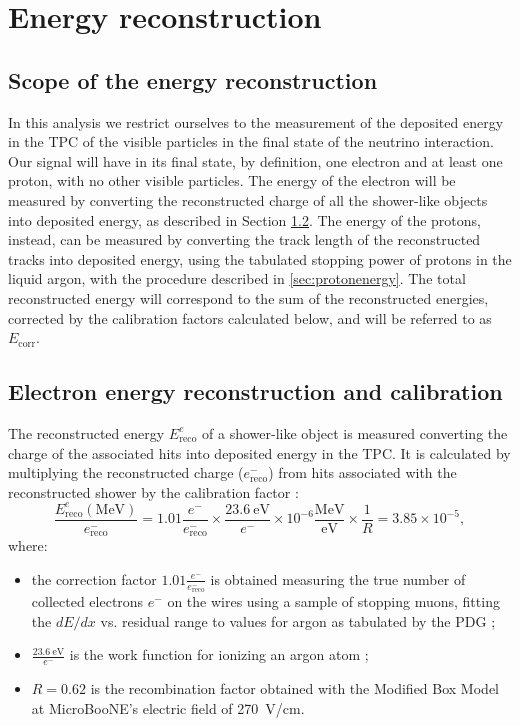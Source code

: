 
\section{Energy reconstruction}\label{sec:energyreco}
\subsection{Scope of the energy reconstruction}
In this analysis we restrict ourselves to the measurement of the deposited energy in the TPC of the visible particles in the final state of the neutrino interaction. Our signal will have in its final state, by definition, one electron and at least one proton, with no other visible particles. The energy of the electron will be measured by converting the reconstructed charge of all the shower-like objects into deposited energy, as described in Section \ref{sec:showerenergy}. The energy of the protons, instead, can be measured by converting the track length of the reconstructed tracks into deposited energy, using the tabulated stopping power of protons in the liquid argon, with the procedure described in \ref{sec:protonenergy}. The total reconstructed energy will correspond to the sum of the reconstructed energies, corrected by the calibration factors calculated below, and will be referred to as $E_{\mathrm{corr}}$. 


\subsection{Electron energy reconstruction and calibration}\label{sec:showerenergy}
The reconstructed energy $E_{\mathrm{reco}}^{e}$ of a shower-like object is measured converting the charge of the associated hits into deposited energy in the TPC. It is calculated by multiplying the reconstructed charge ($e^{-}_{\mathrm{reco}}$) from hits associated with the reconstructed shower by the calibration factor \cite{michel}:
\begin{equation}
\frac{E_{\mathrm{reco}}^{e} \mathrm{(MeV)}}{e^{-}_{\mathrm{reco}}} = 1.01\frac{e^-}{e^{-}_{\mathrm{reco}}} \times \frac{23.6~\mathrm{eV}}{e^-} \times 10^{-6} \frac{\mathrm{MeV}}{\mathrm{eV}} \times \frac{1}{R} = 3.85\times10^{-5},\label{eq:calib}
\end{equation}
where:
\begin{itemize}

\item the correction factor $1.01\frac{e^-}{e^{-}_{\mathrm{reco}}}$ is obtained measuring the true number of collected electrons $e^{-}$ on the wires using a sample of stopping muons, fitting the $dE/dx$ vs. residual range to values for argon as tabulated by the PDG \cite{pdg};
\item $\frac{23.6~\mathrm{eV}}{e^-}$ is the work function for ionizing an argon atom \cite{workfunction};
\item $R = 0.62$ is the recombination factor obtained with the Modified Box Model \cite{boxmodel} at MicroBooNE's electric field of 270~V/cm.
\end{itemize}


